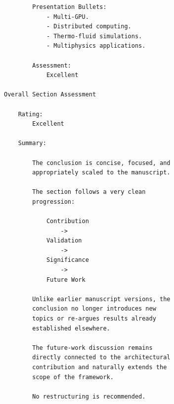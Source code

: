 \begin{verbatim}
        Presentation Bullets:
            - Multi-GPU.
            - Distributed computing.
            - Thermo-fluid simulations.
            - Multiphysics applications.

        Assessment:
            Excellent

Overall Section Assessment

    Rating:
        Excellent

    Summary:

        The conclusion is concise, focused, and
        appropriately scaled to the manuscript.

        The section follows a very clean
        progression:

            Contribution
                ->
            Validation
                ->
            Significance
                ->
            Future Work

        Unlike earlier manuscript versions, the
        conclusion no longer introduces new
        topics or re-argues results already
        established elsewhere.

        The future-work discussion remains
        directly connected to the architectural
        contribution and naturally extends the
        scope of the framework.

        No restructuring is recommended.


\end{verbatim}